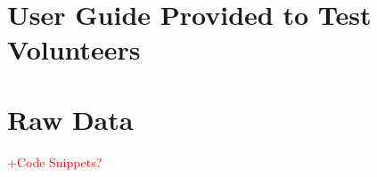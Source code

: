 \chapter{User Guide Provided to Test Volunteers}

\chapter{Raw Data}

\textcolor{red}{+Code Snippets?}
